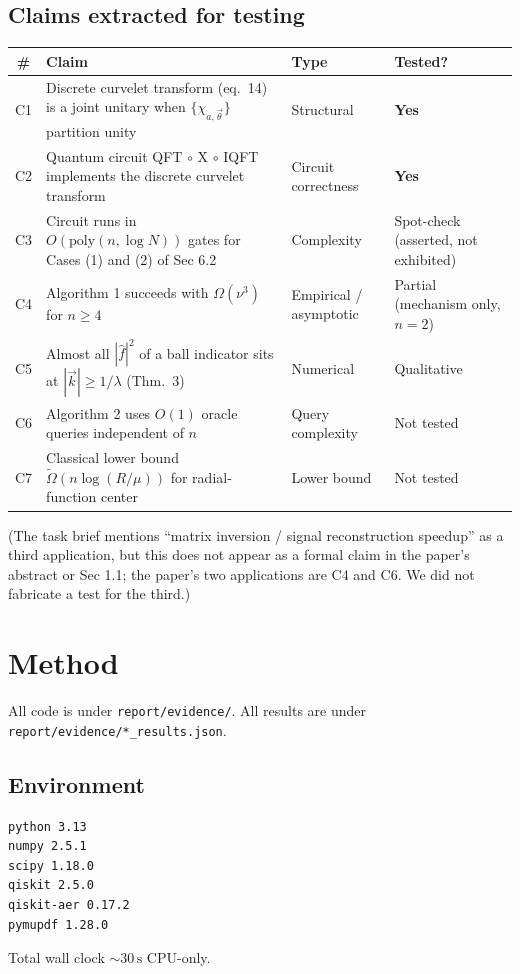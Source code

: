 \documentclass[11pt]{article}
\begin{document}
\subsection{Claims extracted for testing}
\begin{center}
\begin{tabular}{clll}
\toprule
\# & Claim & Type & Tested? \\
\midrule
C1 & Discrete curvelet transform (eq.~14) is a joint unitary when $\{\chi_{a,\vec\theta}\}$ partition unity & Structural & \textbf{Yes} \\
C2 & Quantum circuit QFT $\circ$ X $\circ$ IQFT implements the discrete curvelet transform & Circuit correctness & \textbf{Yes} \\
C3 & Circuit runs in $O(\text{poly}(n, \log N))$ gates for Cases (1) and (2) of Sec 6.2 & Complexity & Spot-check (asserted, not exhibited) \\
C4 & Algorithm 1 succeeds with $\Omega(\nu^3)$ for $n \geq 4$ & Empirical / asymptotic & Partial (mechanism only, $n=2$) \\
C5 & Almost all $|\hat f|^2$ of a ball indicator sits at $|\vec k| \geq 1/\lambda$ (Thm.~3) & Numerical & Qualitative \\
C6 & Algorithm 2 uses $O(1)$ oracle queries independent of $n$ & Query complexity & Not tested \\
C7 & Classical lower bound $\tilde\Omega(n \log(R/\mu))$ for radial-function center & Lower bound & Not tested \\
\bottomrule
\end{tabular}
\end{center}
(The task brief mentions ``matrix inversion / signal reconstruction speedup'' as a third application, but this does not appear as a formal claim in the paper's abstract or Sec 1.1; the paper's two applications are C4 and C6. We did not fabricate a test for the third.)

\section{Method}

All code is under \texttt{report/evidence/}. All results are under \texttt{report/evidence/*\_results.json}.

\subsection{Environment}
\begin{lstlisting}
python 3.13
numpy 2.5.1
scipy 1.18.0
qiskit 2.5.0
qiskit-aer 0.17.2
pymupdf 1.28.0
\end{lstlisting}
Total wall clock $\sim 30\,\text{s}$ CPU-only.
\end{document}
